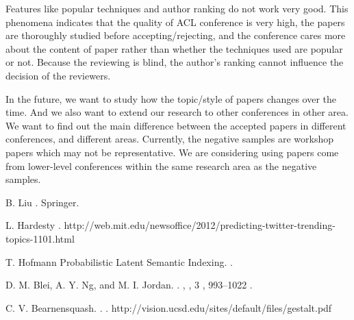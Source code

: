 \documentclass[11pt,letterpaper]{article}
\begin{document}
Features like popular techniques and author ranking do not work very good. 
This phenomena indicates that the quality of ACL conference is very high, the papers are thoroughly studied before accepting/rejecting, and the conference cares more about the content of paper rather than whether the techniques used are popular or not. 
Because the reviewing is blind, the author's ranking cannot influence the decision of the reviewers. 


In the future, we want to study how the topic/style of papers changes over the time. 
And we also want to extend our research to other conferences in other area.
We want to find out the main difference between the accepted papers in different conferences, and different areas. 
Currently, the negative samples are workshop papers which may not be representative. 
We are considering using papers come from lower-level conferences within the same research area as the negative samples. 



\begin{thebibliography}{}

B. Liu
.
\newblock Springer.

L. Hardesty
.
\newblock http://web.mit.edu/newsoffice/2012/predicting-twitter-trending-topics-1101.html

T. Hofmann
{Probabilistic Latent Semantic Indexing}.
.

D. M. Blei, A. Y. Ng, and M. I. Jordan. 
.
,
, 
3 , 993--1022 .

C. V. Bearnensquash.
.
.
\newblock http://vision.ucsd.edu/sites/default/files/gestalt.pdf

\end{thebibliography}




\appendix
\end{document}
